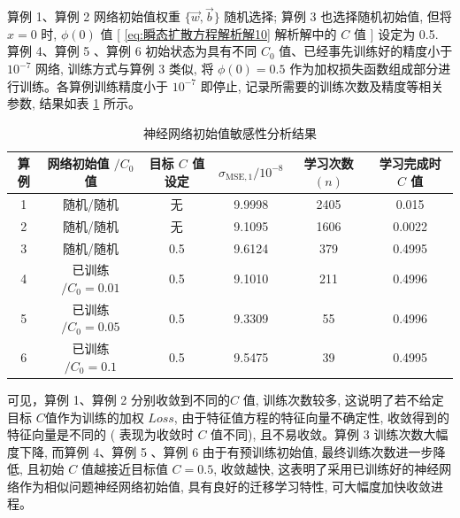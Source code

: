 \documentclass{Sichuan Normal University}
\begin{document}
算例 1、算例 2 网络初始值权重 $\{\vec{w}, \vec{b}\}$ 随机选择; 算例 3 也选择随机初始值, 但将 $x=0$ 时, $\phi(0)$ 值 [ \eqref{eq:瞬态扩散方程解析解10} 解析解中的 $C$ 值 ] 设定为 0.5.
算例 4、算例 5 、算例 6 初始状态为具有不同 $C_0$ 值、已经事先训练好的精度小于 $10^{-7}$ 网络, 训练方式与算例 3 类似, 将 $\phi(0)=0.5$ 作为加权损失函数组成部分进行训练。各算例训练精度小于 $10^{-7}$ 即停止, 记录所需要的训练次数及精度等相关参数, 结果如表 \ref{tab:sensitivity_analysis_results} 所示。
\begin{table}[H]
    \centering
    \begin{tabular}{cccccc}
        \toprule
        \textbf{算例} & \textbf{网络初始值 $/ C_0$ 值} & \textbf{目标 $C$ 值设定} & $\sigma_{\mathrm{MSE}, 1} / 10^{-8}$ & \textbf{学习次数 $(n)$} & \textbf{学习完成时 $C$ 值} \\
        \midrule
        1 & 随机/随机 & 无 & 9.9998 & 2405 & 0.015 \\
        2 & 随机/随机 & 无 & 9.1095 & 1606 & 0.0022 \\
        3 & 随机/随机 & 0.5 & 9.6124 & 379 & 0.4995 \\
        4 & 已训练 $/ C_0=0.01$ & 0.5 & 9.1010 & 211 & 0.4996 \\
        5 & 已训练 $/ C_0=0.05$ & 0.5 & 9.3309 & 55 & 0.4996 \\
        6 & 已训练 $/ C_0=0.1$ & 0.5 & 9.5475 & 39 & 0.4995 \\
        \bottomrule
    \end{tabular}
    \caption{神经网络初始值敏感性分析结果}
    \label{tab:sensitivity_analysis_results}
\end{table}

可见，算例 1、算例 2 分别收敛到不同的$C$ 值, 训练次数较多, 这说明了若不给定目标 $C$值作为训练的加权 $Loss$, 由于特征值方程的特征向量不确定性, 收敛得到的特征向量是不同的 ( 表现为收敛时 $C$ 值不同), 且不易收敛。算例 3 训练次数大幅度下降, 而算例 4、算例 5 、算例 6 由于有预训练初始值, 最终训练次数进一步降低, 且初始 $C$ 值越接近目标值 $C=0.5$, 收敛越快, 这表明了采用已训练好的神经网络作为相似问题神经网络初始值, 具有良好的迁移学习特性, 可大幅度加快收敛进程。


\end{document}

